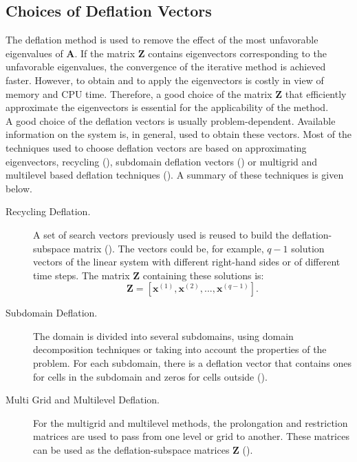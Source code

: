 \documentclass[12pt]{article}
\numberwithin{equation}{section}
\begin{document}
\subsection{Choices of Deflation Vectors}
\hspace{0.5cm}The deflation method is used to remove the effect of the most unfavorable eigenvalues
of $\mathbf{A}$. If the matrix $\mathbf{Z}$ contains eigenvectors corresponding to the unfavorable 
eigenvalues, the convergence of the 
iterative method is achieved faster. However, to obtain and to apply the eigenvectors is costly in view of memory and CPU time.
Therefore, a good choice of the matrix $\mathbf{Z}$ that efficiently approximate the eigenvectors is essential
for the applicability of the method.\\
A good choice of the deflation vectors is usually problem-dependent. Available information on the system is, in general,
used to obtain these vectors.
Most of the techniques used to choose deflation vectors are based on approximating eigenvectors, 
recycling (\cite{Clemens04}), subdomain deflation vectors (\cite{Vuik02}) or multigrid and 
multilevel based deflation techniques (\cite{Tang09,Smith96}). A summary of these techniques is given below.
\begin{description}
 \item [Recycling Deflation.] A set of search vectors previously used is reused to build the deflation-subspace 
 matrix (\cite{Clemens04}). 
The vectors could be, for example, $q-1$
solution vectors of the linear system with different right-hand sides or of different time steps.
The matrix $\mathbf{Z}$ containing these solutions is:
$$\mathbf{Z}=[\mathbf{x}^{(1)},\mathbf{x}^{(2)},...,\mathbf{x}^{(q-1)}].$$
 \item [Subdomain Deflation.] The domain is divided into several subdomains,
 using domain decomposition techniques or taking into account the properties of the problem.
For each subdomain, there is a deflation vector that contains ones for cells in the 
subdomain and zeros for cells outside (\cite{Vuik02}).
 \item [Multi Grid and Multilevel Deflation.] For the multigrid and multilevel methods, 
 the prolongation and restriction matrices are used to pass from one level or grid to another. 
These matrices can be used as the deflation-subspace matrices $\mathbf{Z}$ (\cite{Tang09}).
\end{description}
\end{document}

